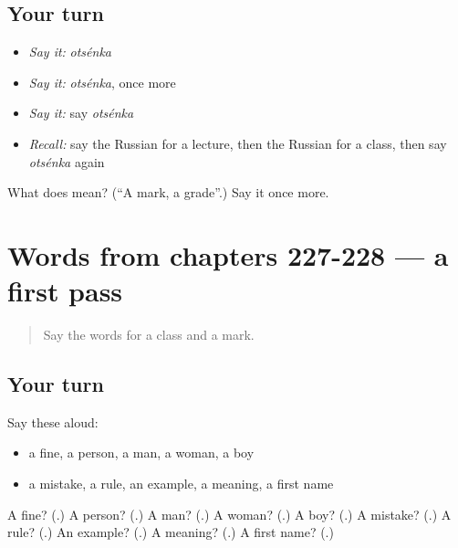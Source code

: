 \subsection*{Your turn}
\begin{itemize}
\raggedright
  \item \emph{Say it:} \emph{otsénka}
  \item \emph{Say it:} \emph{otsénka}, once more
  \item \emph{Say it:} say \emph{otsénka}
  \item \emph{Recall:} say the Russian for a lecture, then the Russian for a class, then say \emph{otsénka} again
\end{itemize}

\begin{tcolorbox}[breakable,colback=teal!4,colframe=teal!35!black,title={Before you move on}]
What does  mean? (\textquotedblleft{}A mark, a grade\textquotedblright{}.) Say it once more.
\end{tcolorbox}
\section[(dialogue)]{Words from chapters 227-228 — a first pass}

\label{lesson:RU-R231-first-pass-words-from-chapters-227-228}



\begin{quote}
Say the words for a class and a mark.
\end{quote}

\subsection*{Your turn}
Say these aloud:

\begin{itemize}
\raggedright
  \item a fine, a person, a man, a woman, a boy
  \item a mistake, a rule, an example, a meaning, a first name
\end{itemize}

\begin{tcolorbox}[breakable,colback=teal!4,colframe=teal!35!black,title={Before you move on}]
A fine? (\textbf{}.) A person? (\textbf{}.) A man? (\textbf{}.) A woman? (\textbf{}.) A boy? (\textbf{}.) A mistake? (\textbf{}.) A rule? (\textbf{}.) An example? (\textbf{}.) A meaning? (\textbf{}.) A first name? (\textbf{}.)
\end{tcolorbox}

